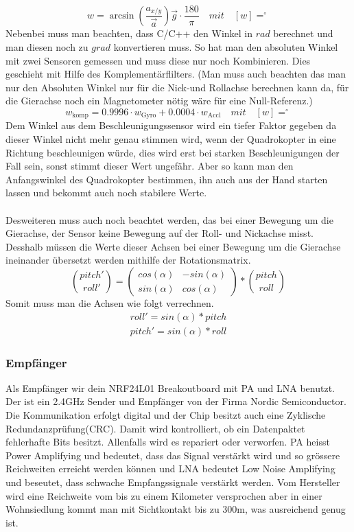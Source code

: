 \documentclass[12pt,a4paper, ngerman]{article}
\begin{document}
\begin{equation}
w=\arcsin(\frac{a_{x/y}}{\vec{a}}
)
\vec{g}\cdot \frac{180}{\pi} \quad mit \quad [w]=^\circ
\end{equation}
Nebenbei muss man beachten, dass C/C++ den Winkel in $rad$ berechnet und man diesen noch zu $grad$ konvertieren muss. So hat man den absoluten Winkel mit zwei Sensoren gemessen und muss diese nur noch Kombinieren. Dies geschieht mit Hilfe des Komplementärflilters. (Man muss auch beachten das man nur den Absoluten Winkel nur für die Nick-und Rollachse berechnen kann da, für die Gierachse noch ein Magnetometer nötig wäre für eine Null-Referenz.)
\begin{equation}
w_{\text{komp}}=0.9996\cdot w_{\text{Gyro}}+0.0004\cdot w_{\text{Accl}} \quad mit \quad [w]=^\circ
\end{equation}
Dem Winkel aus dem Beschleunigungssensor wird ein tiefer Faktor gegeben da dieser Winkel nicht mehr genau stimmen wird, wenn der Quadrokopter in eine Richtung beschleunigen würde, dies wird erst bei starken Beschleunigungen der Fall sein, sonst stimmt dieser Wert ungefähr. Aber so kann man den Anfangswinkel des Quadrokopter bestimmen, ihn auch aus der Hand starten lassen und bekommt auch noch stabilere Werte. \\ \\
Desweiteren muss auch noch beachtet werden, das bei einer Bewegung um die Gierachse, der Sensor keine Bewegung auf der Roll- und Nickachse misst. Desshalb müssen die Werte dieser Achsen bei einer Bewegung um die Gierachse ineinander übersetzt werden mithilfe der Rotationsmatrix.
\begin{equation}
\binom{pitch'}{roll'}=\begin{pmatrix}
cos(\alpha) & -sin(\alpha)\\ 
sin(\alpha) & cos(\alpha)
\end{pmatrix}*\binom{pitch}{roll}
\end{equation}
Somit muss man die Achsen wie folgt verrechnen.
\begin{align} 
roll' = sin(\alpha)*pitch\\
pitch'= sin(\alpha)*roll
\end{align} 

\subsubsection{Empfänger}
Als Empfänger wir dein NRF24L01 Breakoutboard mit PA und LNA benutzt. Der ist ein 2.4GHz Sender und Empfänger von der Firma Nordic Semiconductor. Die Kommunikation erfolgt digital und der Chip besitzt auch eine Zyklische Redundanzprüfung(CRC). Damit wird kontrolliert, ob ein Datenpaktet fehlerhafte Bits besitzt. Allenfalls wird es repariert oder verworfen. PA heisst Power Amplifying und bedeutet, dass das Signal verstärkt wird und so grössere Reichweiten erreicht werden können und LNA bedeutet Low Noise Amplifying und beseutet, dass schwache Empfangssignale verstärkt werden.\cite{website:electronics.stackexchange.com_WhatisPALNA} Vom Hersteller wird eine Reichweite vom bis zu einem Kilometer versprochen aber in einer Wohnsiedlung kommt man mit Sichtkontakt bis zu 300m, was ausreichend genug ist.
\end{document}

